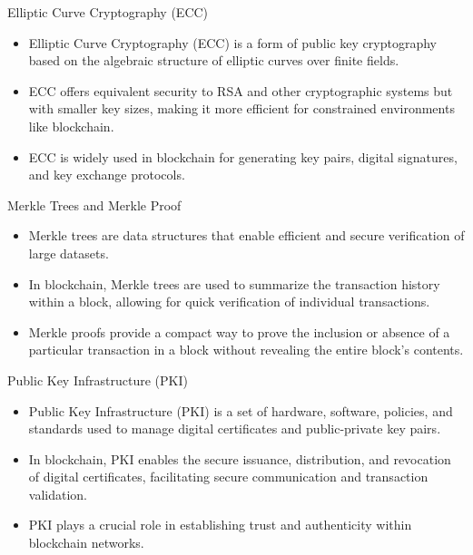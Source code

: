 \begin{withoutheadline}
\begin{frame}[fragile]{Elliptic Curve Cryptography (ECC)}
    \begin{itemize}
        \item Elliptic Curve Cryptography (ECC) is a form of public key cryptography based on the algebraic structure of elliptic curves over finite fields.
        \item ECC offers equivalent security to RSA and other cryptographic systems but with smaller key sizes, making it more efficient for constrained environments like blockchain.
        \item ECC is widely used in blockchain for generating key pairs, digital signatures, and key exchange protocols.
    \end{itemize}

    

    
\end{frame}

\begin{frame}[fragile]{Merkle Trees and Merkle Proof}
    \begin{itemize}
        \item Merkle trees are data structures that enable efficient and secure verification of large datasets.
        \item In blockchain, Merkle trees are used to summarize the transaction history within a block, allowing for quick verification of individual transactions.
        \item Merkle proofs provide a compact way to prove the inclusion or absence of a particular transaction in a block without revealing the entire block's contents.
    \end{itemize}
    
\end{frame}

\begin{frame}[fragile]{Public Key Infrastructure (PKI)}
    \begin{itemize}
        \item Public Key Infrastructure (PKI) is a set of hardware, software, policies, and standards used to manage digital certificates and public-private key pairs.
        \item In blockchain, PKI enables the secure issuance, distribution, and revocation of digital certificates, facilitating secure communication and transaction validation.
        \item PKI plays a crucial role in establishing trust and authenticity within blockchain networks.
    \end{itemize}
    
\end{frame}


\end{withoutheadline}
